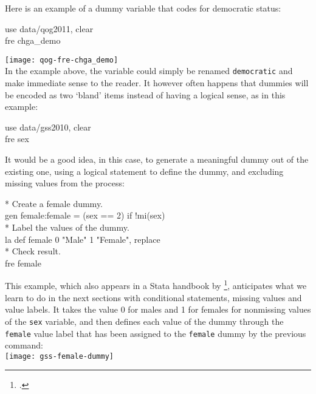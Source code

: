 \begin{description}
	Here is an example of a \QOG dummy variable that codes for democratic status:\\[1em]
	
	\begin{docspec}
		use data/qog2011, clear\\
		fre chga\_demo
	\end{docspec}
	
	\texttt{[image: qog-fre-chga\_demo]}\\[1em]
	
	In the example above, the variable could simply be renamed \texttt{democratic} and make immediate sense to the reader. It however often happens that dummies will be encoded as two `bland' items instead of having a logical sense, as in this \gss example:
	
	\begin{docspec}
		use data/gss2010, clear\\
		fre sex
	\end{docspec}
	
	It would be a good idea, in this case, to generate a meaningful dummy out of the existing one, using a logical statement to define the dummy, and excluding missing values from the process:%
		\label{female-dummy}
	
	\begin{docspec}
		* Create a female dummy.\\
		gen female:female = (sex == 2) if !mi(sex)\\[1em]
		
		* Label the values of the dummy.\\
		la def female 0 "Male" 1 "Female", replace\\[1em]
		
		* Check result.\\
		fre female
	\end{docspec}

	This example, which also appears in a Stata handbook by \cite{LongFreese:2001a}\footcite{FeinsteinThomas:2002d}, anticipates what we learn to do in the next sections with conditional statements, missing values and value labels. It takes the value 0 for males and 1 for females for nonmissing values of the \texttt{sex} variable, and then defines each value of the dummy through the \texttt{female} value label that has been assigned to the \texttt{female} dummy by the previous  command:\\[1em]
	
	\texttt{[image: gss-female-dummy]}
	

\end{description}
